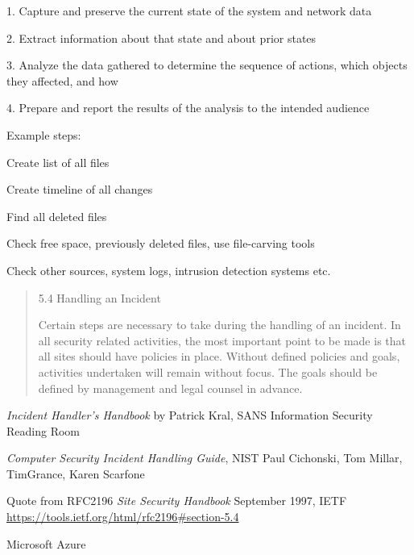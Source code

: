 \documentclass[Screen16to9,17pt]{foils}
\begin{document}

\begin{list2}
\item 1. Capture and preserve the current state of the system and network data
\item 2. Extract information about that state and about prior states
\item 3. Analyze the data gathered to determine the sequence of actions, which objects they affected, and how
\item 4. Prepare and report the results of the analysis to the intended audience
\vskip 1cm
\item Example steps:
\item Create list of all files
\item Create timeline of all changes
\item Find all deleted files
\item Check free space, previously deleted files, use file-carving tools
\item Check other sources, system logs, intrusion detection systems etc.
\end{list2}


\begin{quote}
  5.4  Handling an Incident

     Certain steps are necessary to take during the handling of an
     incident.  In all security related activities, the most important
     point to be made is that all sites should have policies in place.
     Without defined policies and goals, activities undertaken will remain
     without focus. The goals should be defined by management and legal
     counsel in advance.
\end{quote}

\begin{list2}
\item \emph{Incident Handler's Handbook}
  by Patrick Kral, SANS Information Security Reading Room\\
  {\footnotesize {}}
  \item \emph{Computer Security
Incident Handling Guide}, NIST Paul Cichonski,
Tom Millar,
TimGrance,
Karen Scarfone\\ {\footnotesize{}}
\item Quote from RFC2196 \emph{Site Security Handbook} September 1997, IETF\\
{\footnotesize\url{https://tools.ietf.org/html/rfc2196#section-5.4}}
\item {}
\item Microsoft Azure
\end{list2}
\end{document}
